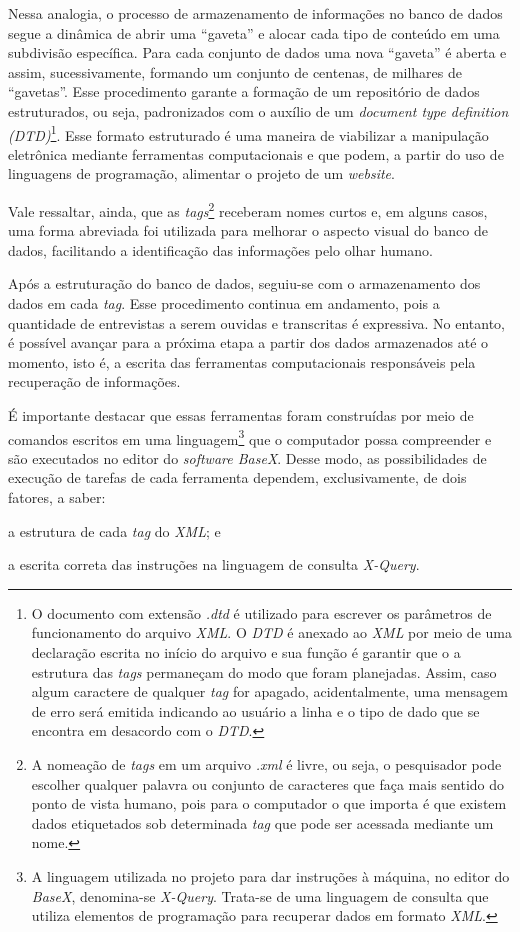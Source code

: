 \documentclass[portuguese]{textolivre}
\begin{document}
Nessa analogia, o processo de armazenamento de informações no banco de dados segue a dinâmica de abrir uma “gaveta” e alocar cada tipo de conteúdo em uma subdivisão específica. Para cada conjunto de dados uma nova “gaveta” é aberta e assim, sucessivamente, formando um conjunto de centenas, de milhares de “gavetas”. Esse procedimento garante a formação de um repositório de dados estruturados, ou seja, padronizados com o auxílio de um \emph{document type definition (DTD)}\footnote{O documento com extensão \emph{.dtd} é utilizado para escrever os parâmetros de funcionamento do arquivo \emph{XML}. O \emph{DTD} é anexado ao \emph{XML} por meio de uma declaração escrita no início do arquivo e sua função é garantir que o a estrutura das \emph{tags} permaneçam do modo que foram planejadas. Assim, caso algum caractere de qualquer \emph{tag} for apagado, acidentalmente, uma mensagem de erro será emitida indicando ao usuário a linha e o tipo de dado que se encontra em desacordo com o \emph{DTD}.}. Esse formato estruturado é uma maneira de viabilizar a manipulação eletrônica mediante ferramentas computacionais e que podem, a partir do uso de linguagens de programação, alimentar o projeto de um \emph{website}.

Vale ressaltar, ainda, que as \emph{tags}\footnote{A nomeação de \emph{tags} em um arquivo \emph{.xml} é livre, ou seja, o pesquisador pode escolher qualquer palavra ou conjunto de caracteres que faça mais sentido do ponto de vista humano, pois para o computador o que importa é que existem dados etiquetados sob determinada \emph{tag} que pode ser acessada mediante um nome.} receberam nomes curtos e, em alguns casos, uma forma abreviada foi utilizada para melhorar o aspecto visual do banco de dados, facilitando a identificação das informações pelo olhar humano.

Após a estruturação do banco de dados, seguiu-se com o armazenamento dos dados em cada \emph{tag}. Esse procedimento continua em andamento, pois a quantidade de entrevistas a serem ouvidas e transcritas é expressiva. No entanto, é possível avançar para a próxima etapa a partir dos dados armazenados até o momento, isto é, a escrita das ferramentas computacionais responsáveis pela recuperação de informações.

É importante destacar que essas ferramentas foram construídas por meio de comandos escritos em uma linguagem\footnote{A linguagem utilizada no projeto para dar instruções à máquina, no editor do \emph{BaseX}, denomina-se \emph{X-Query}. Trata-se de uma linguagem de consulta que utiliza elementos de programação para recuperar dados em formato \emph{XML}.} que o computador possa compreender e são executados no editor do \emph{software BaseX}. Desse modo, as possibilidades de execução de tarefas de cada ferramenta dependem, exclusivamente, de dois fatores, a saber: 
\begin{enumerate*}[label=\roman*)]
\item a estrutura de cada \mkbibemph{tag} do \emph{XML}; e
\item a escrita correta das instruções na linguagem de consulta \emph{X-Query}.
\end{enumerate*}
\end{document}
